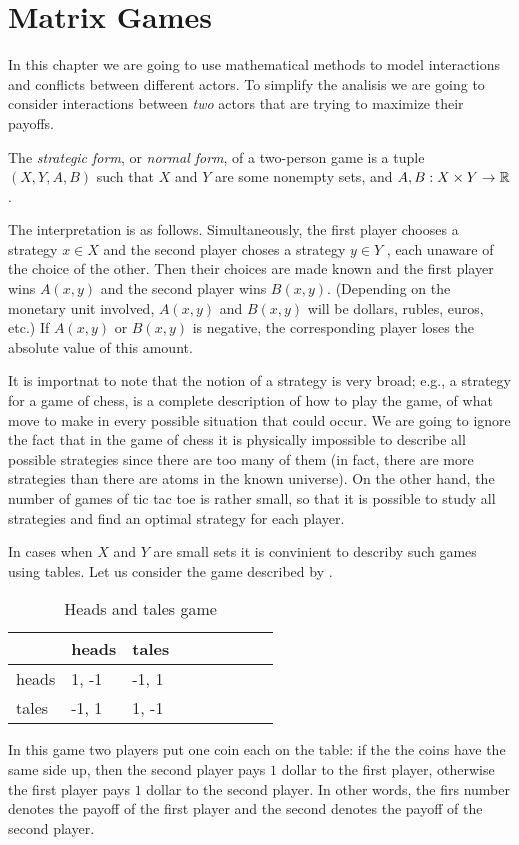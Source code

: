 \chapter{Matrix Games}
In this chapter we are going to use mathematical methods to model interactions
and conflicts between different actors. To simplify the analisis we are going to
consider interactions between \emph{two} actors that are trying to maximize
their payoffs.

\begin{definition}
  The \emph{strategic form}, or \emph{normal form}, of a two-person game is
  a tuple $(X, Y, A, B)$ such that $X$ and $Y$ are some nonempty sets, and 
  $A, B  : X \times Y \to {\mathbb{R}}$.
\end{definition}
The interpretation is as follows. Simultaneously, the first player chooses 
a strategy $x \in X$ and the second player choses a strategy $y \in Y$ , each
unaware of the choice of the other. Then their choices are made known and the
first player wins $A(x, y)$ and the second player wins $B(x, y)$. (Depending on
the monetary unit involved, $A(x, y)$ and $B(x, y)$ will be dollars, rubles,
euros, etc.) If $A(x, y)$ or $B(x, y)$ is negative, the corresponding player
loses the absolute value of this amount.

It is importnat to note that the notion of a strategy is very broad; e.g., a
strategy for a game of chess, is a complete description of how to play the game,
of what move to make in every possible situation that could occur. We are going
to ignore the fact that in the game of chess it is physically impossible to
describe all possible strategies since there are too many of them (in fact,
there are more strategies than there are atoms in the known universe). On the
other hand, the number of games of tic tac toe is rather small, so that it is
possible to study all strategies and find an optimal strategy for each player.

In cases when $X$ and $Y$ are small sets it is convinient to describy such games
using tables. Let us consider the game described by
.
\begin{table}
  \begin{center}
    \begin{tabular}{l l l  l  l  l  l  l  l}
      \toprule
            & heads  & tales   \\
      \midrule
      heads & 1, -1 & -1, 1   \\
      tales & -1, 1 & 1, -1   \\
      \bottomrule
    \end{tabular}
  \end{center}
  \caption{Heads and tales game}
  \label{table:heads-and-tales-game}
\end{table}
In this game two players put one coin each on the table: if the the coins have
the same side up, then the second player pays $1$ dollar to the first player,
otherwise the first player pays $1$ dollar to the second player. In other words,
the firs number denotes the payoff of the first player and the second denotes
the payoff of the second player.

